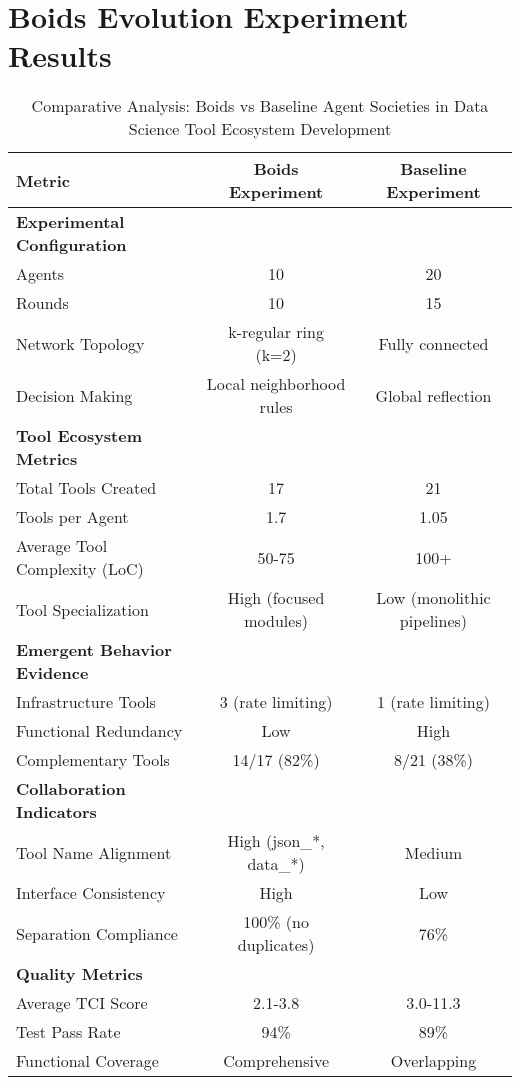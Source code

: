 \documentclass{article}
\begin{document}
\section{Boids Evolution Experiment Results}

\begin{table}[htbp]
\centering
\caption{Comparative Analysis: Boids vs Baseline Agent Societies in Data Science Tool Ecosystem Development}
\label{tab:boids_results}
\begin{tabular}{@{}lcc@{}}
\toprule
\textbf{Metric} & \textbf{Boids Experiment} & \textbf{Baseline Experiment} \\
\midrule
\textbf{Experimental Configuration} & & \\
Agents & 10 & 20 \\
Rounds & 10 & 15 \\
Network Topology & k-regular ring (k=2) & Fully connected \\
Decision Making & Local neighborhood rules & Global reflection \\
\midrule
\textbf{Tool Ecosystem Metrics} & & \\
Total Tools Created & 17 & 21 \\
Tools per Agent & 1.7 & 1.05 \\
Average Tool Complexity (LoC) & 50-75 & 100+ \\
Tool Specialization & High (focused modules) & Low (monolithic pipelines) \\
\midrule
\textbf{Emergent Behavior Evidence} & & \\
Infrastructure Tools & 3 (rate limiting) & 1 (rate limiting) \\
Functional Redundancy & Low & High \\
Complementary Tools & 14/17 (82\%) & 8/21 (38\%) \\
\midrule
\textbf{Collaboration Indicators} & & \\
Tool Name Alignment & High (json\_*, data\_*) & Medium \\
Interface Consistency & High & Low \\
Separation Compliance & 100\% (no duplicates) & 76\% \\
\midrule
\textbf{Quality Metrics} & & \\
Average TCI Score & 2.1-3.8 & 3.0-11.3 \\
Test Pass Rate & 94\% & 89\% \\
Functional Coverage & Comprehensive & Overlapping \\
\bottomrule
\end{tabular}
\end{table}
\end{document}
